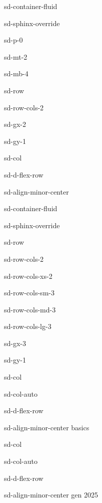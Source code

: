 \documentclass[letterpaper,10pt,italian]{jupyterBook}
\begin{document}
\sphinxstepscope

\begin{sphinxuseclass}{sd-container-fluid}
\begin{sphinxuseclass}{sd-sphinx-override}
\begin{sphinxuseclass}{sd-p-0}
\begin{sphinxuseclass}{sd-mt-2}
\begin{sphinxuseclass}{sd-mb-4}
\begin{sphinxuseclass}{sd-row}
\begin{sphinxuseclass}{sd-row-cols-2}
\begin{sphinxuseclass}{sd-gx-2}
\begin{sphinxuseclass}{sd-gy-1}
\begin{sphinxuseclass}{sd-col}
\begin{sphinxuseclass}{sd-d-flex-row}
\begin{sphinxuseclass}{sd-align-minor-center}
\begin{sphinxuseclass}{sd-container-fluid}
\begin{sphinxuseclass}{sd-sphinx-override}
\begin{sphinxuseclass}{sd-row}
\begin{sphinxuseclass}{sd-row-cols-2}
\begin{sphinxuseclass}{sd-row-cols-xs-2}
\begin{sphinxuseclass}{sd-row-cols-sm-3}
\begin{sphinxuseclass}{sd-row-cols-md-3}
\begin{sphinxuseclass}{sd-row-cols-lg-3}
\begin{sphinxuseclass}{sd-gx-3}
\begin{sphinxuseclass}{sd-gy-1}
\begin{sphinxuseclass}{sd-col}
\begin{sphinxuseclass}{sd-col-auto}
\begin{sphinxuseclass}{sd-d-flex-row}
\begin{sphinxuseclass}{sd-align-minor-center}
\sphinxAtStartPar
basics

\end{sphinxuseclass}
\end{sphinxuseclass}
\end{sphinxuseclass}
\end{sphinxuseclass}
\begin{sphinxuseclass}{sd-col}
\begin{sphinxuseclass}{sd-col-auto}
\begin{sphinxuseclass}{sd-d-flex-row}
\begin{sphinxuseclass}{sd-align-minor-center}
 gen 2025


\end{sphinxuseclass}
\end{sphinxuseclass}
\end{sphinxuseclass}
\end{sphinxuseclass}
\end{sphinxuseclass}
\end{sphinxuseclass}
\end{sphinxuseclass}
\end{sphinxuseclass}
\end{sphinxuseclass}
\end{sphinxuseclass}
\end{sphinxuseclass}
\end{sphinxuseclass}
\end{sphinxuseclass}
\end{sphinxuseclass}
\end{sphinxuseclass}
\end{sphinxuseclass}
\end{sphinxuseclass}
\end{sphinxuseclass}
\end{sphinxuseclass}
\end{sphinxuseclass}
\end{sphinxuseclass}
\end{sphinxuseclass}
\end{sphinxuseclass}
\end{sphinxuseclass}
\end{sphinxuseclass}
\end{sphinxuseclass}
\end{document}
